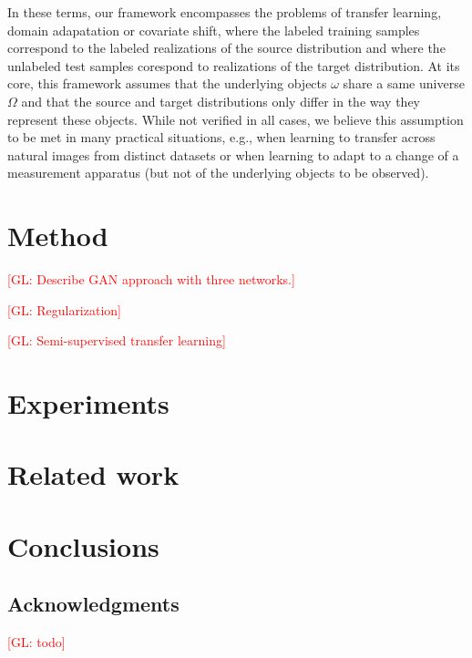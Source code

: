 \documentclass{article}
\newcommand{\glnote}[1]{\textcolor{red}{[GL: #1]}}
\begin{document}
In these terms, our framework encompasses the problems of transfer learning,
domain adapatation or covariate shift, where the labeled training samples
correspond to the labeled realizations of the source distribution and where the
unlabeled test samples corespond to realizations of the target distribution. At
its core, this framework assumes that the underlying objects $\omega$ share a
same universe $\Omega$ and that the source and target distributions only differ
in the way they represent these objects. While not verified in all cases, we
believe this assumption to be met in many practical situations, e.g., when learning to transfer
across natural images from distinct datasets or when learning to adapt to a change
of a measurement apparatus (but not of the underlying objects to be observed).



\section{Method}

\glnote{Describe GAN approach with three networks.}

\glnote{Regularization}

\glnote{Semi-supervised transfer learning}

\section{Experiments}


\section{Related work}


\section{Conclusions}


\subsection*{Acknowledgments}

\glnote{todo}



\end{document}
